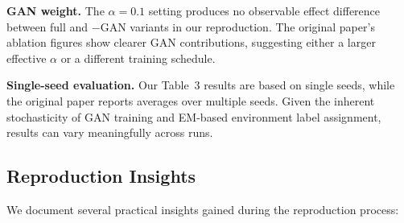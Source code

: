 \documentclass[review,anonymous]{acmart}
\begin{document}
\textbf{GAN weight.} The $\alpha = 0.1$ setting produces no observable effect
difference between full and $-$\!GAN variants in our reproduction. The original
paper's ablation figures show clearer GAN contributions, suggesting either a
larger effective $\alpha$ or a different training schedule.

\textbf{Single-seed evaluation.} Our Table~3 results are based on single seeds,
while the original paper reports averages over multiple seeds. Given the inherent
stochasticity of GAN training and EM-based environment label assignment, results
can vary meaningfully across runs.

\subsection{Reproduction Insights}

We document several practical insights gained during the reproduction process:
\end{document}
